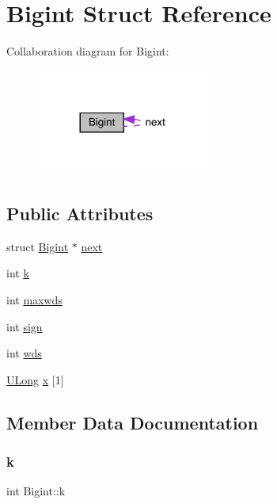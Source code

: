 \hypertarget{struct_bigint}{}\section{Bigint Struct Reference}
\label{struct_bigint}


Collaboration diagram for Bigint\+:
\nopagebreak
\begin{figure}[H]
\begin{center}
\leavevmode
\includegraphics[width=161pt]{struct_bigint__coll__graph}
\end{center}
\end{figure}
\subsection*{Public Attributes}
\begin{DoxyCompactItemize}
\item 
struct \hyperlink{struct_bigint}{Bigint} $\ast$ \hyperlink{struct_bigint_a3a1296e26ef617e775d5e366e390e7fc}{next}
\item 
int \hyperlink{struct_bigint_a032d76e80da2f21df10c0794244d12f2}{k}
\item 
int \hyperlink{struct_bigint_a5ffcac6f95ded3bc1fc23204f46f10d0}{maxwds}
\item 
int \hyperlink{struct_bigint_a4380eb98f7653bb74d8377c0d68d6cb7}{sign}
\item 
int \hyperlink{struct_bigint_aa737992ebddb9d6a7e2d23bfecdb080e}{wds}
\item 
\hyperlink{dtoa_8c_afa5f820499f9d3fb566021c346784449}{U\+Long} \hyperlink{struct_bigint_ae56981315f471a190603887aee98ca99}{x} \mbox{[}1\mbox{]}
\end{DoxyCompactItemize}


\subsection{Member Data Documentation}
\mbox{\label{struct_bigint_a032d76e80da2f21df10c0794244d12f2}} 
\subsubsection{\texorpdfstring{k}{k}}
{\footnotesize\ttfamily int Bigint\+::k}

